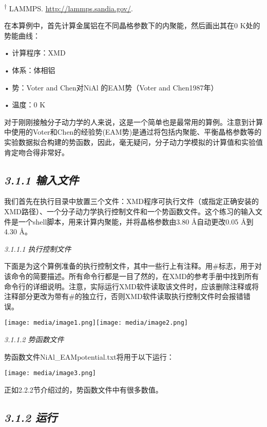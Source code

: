\documentclass[
]{article}
\begin{document}
\textsuperscript{†} LAMMPS.
\href{http://lammps.sandia.gov/}{\underline{http://lammps.sandia.gov/}}.

在本算例中，首先计算金属铝在不同晶格参数下的内聚能，然后画出其在0
K处的势能曲线：

• 计算程序：XMD

• 体系：体相铝

• 势：Voter and Chen对NiAl 的EAM势（Voter and Chen1987年）

• 温度：0 K

对于刚刚接触分子动力学的人来说，这是一个简单也是最常用的算例。注意到计算中使用的Voter和Chen的经验势(EAM势)是通过将包括内聚能、平衡晶格参数等的实验数据拟合构建的势函数，因此，毫无疑问，分子动力学模拟的计算值和实验值肯定吻合得非常好。

\hypertarget{ux8f93ux5165ux6587ux4ef6}{%
\subsection{\texorpdfstring{\emph{3.1.1
输入文件}}{3.1.1 输入文件}}\label{ux8f93ux5165ux6587ux4ef6}}

我们首先在执行目录中放置三个文件：XMD程序可执行文件（或指定正确安装的XMD路径）、一个分子动力学执行控制文件和一个势函数文件。这个练习的输入文件是一个shell脚本，用来计算内聚能，并将晶格参数由3.80
Å自动更改0.05 Å到4.30 Å。

\emph{3.1.1.1 执行控制文件}

下面是为这个算例准备的执行控制文件，其中一些行上有注释。用\#标志，用于对该命令的简要描述。所有命令行都是一目了然的，在XMD的参考手册中找到所有命令行的详细说明。注意，实际运行XMD软件读取该文件时，应该删除注释或将注释部分更改为带有\#的独立行，否则XMD软件读取执行控制文件时会报错错误。

\texttt{[image: media/image1.png]}\texttt{[image: media/image2.png]}

\emph{3.1.1.2 势函数文件}

势函数文件NiAl\_EAMpotential.txt将用于以下运行：

\texttt{[image: media/image3.png]}

正如2.2.2节介绍过的，势函数文件中有很多数值。

\hypertarget{ux8fd0ux884c}{%
\subsection{\texorpdfstring{\emph{3.1.2
运行}}{3.1.2 运行}}\label{ux8fd0ux884c}}
\end{document}
